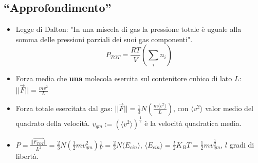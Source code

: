\documentclass[10pt,a4paper]{article}
\newcommand{\norm}[1]{{\ensuremath{||{#1}||}}}
\newcommand{\ang}[1]{{\ensuremath{\langle {#1}\rangle}}}
\begin{document}
\begin{multicols}{2}
  \subsection*{``Approfondimento''}
  \begin{itemize}
  \item Legge di Dalton: "In una miscela di gas la pressione totale \`e uguale alla somma delle pressioni parziali dei suoi gas componenti". $$P_{TOT} = \frac{RT}{V}\left( \sum_{i} n_i \right)$$
  \item Forza media che {\bf una} molecola esercita sul contenitore cubico di lato $L$: $\norm{\vec{F}} = \frac{mv^2}{L}$
  \item Forza totale esercitata dal gas: $\norm{\vec{F}} = \frac{1}{3}N \left(\frac{m \ang{v^2}}{L} \right)$, con $\ang{v^2}$ valor medio del quadrato della velocit\`a. $v_{qm} := (\ang{v^2})^{\frac{1}{2}}$ \`e la velocit\`a quadratica media.
  \item $P = \frac{\norm{\vec{F_{TOT}}}}{L^2} = \frac{2}{3} N \left(\frac{1}{2}m {v_{qm}^{2}} \right) \frac{1}{V} = \frac{2}{3} N \ang{E_{cin}}$, $\ang{E_{cin}} = \frac{l}{2}K_BT = \frac{1}{2}m{v_{qm}^\frac{1}{2}}$, $l$ gradi di libert\`a.
  \end{itemize}

\end{multicols}
\end{document}
